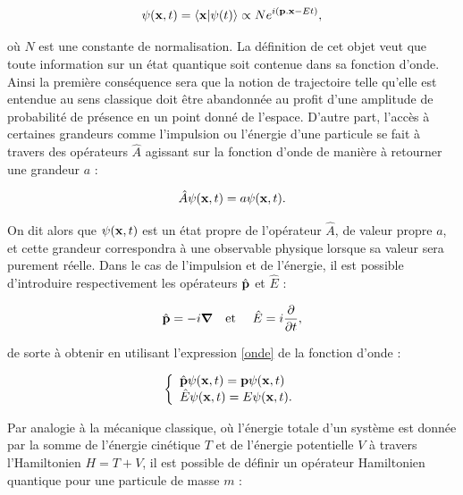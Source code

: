         \begin{equation}
            \psi(\vb{x},t)=\bra{\vb{x}}\ket{\psi(t)}\propto Ne^{i(\vb{p}.\vb{x}-Et)},
            \label{onde}
        \end{equation}
            
        où $N$ est une constante de normalisation. La définition de cet objet veut que toute information sur un état quantique soit contenue dans sa fonction d'onde. Ainsi la première conséquence sera que la notion de trajectoire telle qu'elle est entendue au sens classique doit être abandonnée au profit d'une amplitude de probabilité de présence en un point donné de l'espace. D'autre part, l'accès à certaines grandeurs comme l'impulsion ou l'énergie d'une particule se fait à travers des opérateurs $\hat{A}$ agissant sur la fonction d'onde de manière à retourner une grandeur $a$ :
        
        \begin{equation}
            \hat{A}\psi(\vb{x},t)=a\psi(\vb{x},t).
        \end{equation}
        
        On dit alors que $\psi(\vb{x},t)$ est un état propre de l'opérateur $\hat{A}$, de valeur propre $a$, et cette grandeur correspondra à une observable physique lorsque sa valeur sera purement réelle. Dans le cas de l'impulsion et de l'énergie, il est possible d'introduire respectivement les opérateurs $\hat{\vb{p}}$ et $\hat{E}$ :
        
        \begin{equation}
            \hat{\vb{p}} = -i\grad \quad \mbox{et } \quad
            \hat{E} = i\pderivative{t},
            \label{ops}
        \end{equation}

        de sorte à obtenir en utilisant l'expression \ref{onde} de la fonction d'onde :
        
        \begin{equation}
            \left\{
                \begin{array}{ll}
                    \hat{\vb{p}}\psi(\vb{x},t)=\vb{p}\psi(\vb{x},t) \\
                    \hat{E}\psi(\vb{x},t)=E\psi(\vb{x},t).
                \end{array}
            \right.
        \end{equation}       
        
        Par analogie à la mécanique classique, où l'énergie totale d'un système est donnée par la somme de l'énergie cinétique $T$ et de l'énergie potentielle $V$ à travers l'Hamiltonien $H=T+V$, il est possible de définir un opérateur Hamiltonien quantique pour une particule de masse $m$ :
        
